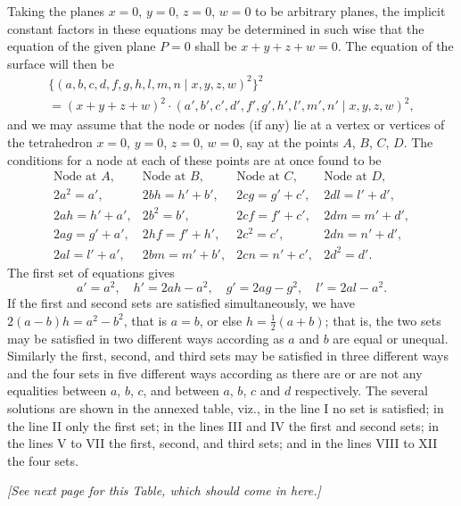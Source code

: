 \documentclass[11pt,a4paper]{article}
\providecommand{\midbar}{\mid}
\begin{document}
Taking the planes $x = 0$, $y = 0$, $z = 0$, $w = 0$ to be arbitrary
planes, the implicit constant factors in these equations may be
determined in such wise that the equation of the given plane $P = 0$
shall be $x + y + z + w = 0$. The equation of the surface will then be
\begin{multline*}
\{(a, b, c, d, f, g, h, l, m, n\!\midbar\! x, y, z, w)^{2}\}^{2}\\
= (x + y + z + w)^{2} \cdot (a', b', c', d', f', g', h', l', m', n'
\!\midbar\! x, y, z, w)^{2},
\end{multline*}
and we may assume that the node or nodes (if any) lie at a vertex or
vertices of the tetrahedron $x = 0$, $y = 0$, $z = 0$, $w = 0$, say at the
points $A$, $B$, $C$, $D$. The conditions for a node at each of these
points are at once found to be
\[
\begin{array}{llll}
\text{Node at } A, & \text{Node at } B, & \text{Node at } C, & \text{Node at } D,\\[2pt]
2 a^{2} = a', & 2 b h = h' + b', & 2 c g = g' + c', & 2 d l = l' + d',\\
2 a h = h' + a', & 2 b^{2} = b', & 2 c f = f' + c', & 2 d m = m' + d',\\
2 a g = g' + a', & 2 h f = f' + h', & 2 c^{2} = c', & 2 d n = n' + d',\\
2 a l = l' + a', & 2 b m = m' + b', & 2 c n = n' + c', & 2 d^{2} = d'.
\end{array}
\]
The first set of equations gives
\[
a' = a^{2},\quad h' = 2 a h - a^{2},\quad g' = 2 a g - g^{2},\quad
l' = 2 a l - a^{2}.
\]
If the first and second sets are satisfied simultaneously, we have
$2(a - b) h = a^{2} - b^{2}$, that is $a = b$, or else
$h = \tfrac{1}{2}(a + b)$; that is, the two sets may be satisfied in two
different ways according as $a$ and $b$ are equal or unequal. Similarly
the first, second, and third sets may be satisfied in three different
ways and the four sets in five different ways according as there are or
are not any equalities between $a$, $b$, $c$, and between $a$, $b$, $c$
and $d$ respectively. The several solutions are shown in the annexed
table, viz., in the line I no set is satisfied; in the line II only the
first set; in the lines III and IV the first and second sets; in the
lines V to VII the first, second, and third sets; and in the lines VIII
to XII the four sets.

\medskip

\noindent\textit{[See next page for this Table, which should come in here.]}
\end{document}
